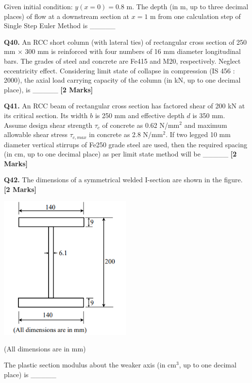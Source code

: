 \documentclass[11pt]{article}
\newcommand{\questionb}[2]{
    \noindent\textbf{Q#2.} #1 \hfill \textbf{[2 Marks]}
}
\begin{document}
Given initial condition: \( y(x = 0) = 0.8 \) m. The depth (in m, up to three decimal places) of flow at a downstream section at \( x = 1 \) m from one calculation step of Single Step Euler Method is \_\_\_\_\_
\vspace{0.5cm}

\questionb{An RCC short column (with lateral ties) of rectangular cross section of 250 mm × 300 mm is reinforced with four numbers of 16 mm diameter longitudinal bars. The grades of steel and concrete are Fe415 and M20, respectively. Neglect eccentricity effect. Considering limit state of collapse in compression (IS 456 : 2000), the axial load carrying capacity of the column (in kN, up to one decimal place), is \_\_\_\_\_}{40}
\vspace{0.5cm}

\questionb{An RCC beam of rectangular cross section has factored shear of 200 kN at its critical section. Its width \( b \) is 250 mm and effective depth \( d \) is 350 mm. Assume design shear strength \( \tau_c \) of concrete as 0.62 N/mm\(^2\) and maximum allowable shear stress \( \tau_{c,max} \) in concrete as 2.8 N/mm\(^2\). If two legged 10 mm diameter vertical stirrups of Fe250 grade steel are used, then the required spacing (in cm, up to one decimal place) as per limit state method will be \_\_\_\_\_}{41}
\vspace{0.5cm}

\questionb{The dimensions of a symmetrical welded I-section are shown in the figure.}{42}
\begin{center}
\includegraphics[width=0.5\textwidth]{figures/q42}
\end{center}
(All dimensions are in mm)

The plastic section modulus about the weaker axis (in cm\(^3\), up to one decimal place) is \_\_\_\_\_
\vspace{0.5cm}
\end{document}
